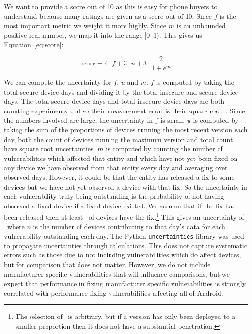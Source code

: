 We want to provide a score out of 10 as this is easy for phone buyers to understand because many ratings are given as a score out of 10.
Since $f$ is the most important metric we weight it more highly.
Since $m$ is an unbounded positive real number, we map it into the range [0--1).
This gives us Equation~\ref{eq:score}:

\begin{equation}
\mathrm{score} = 4 \cdot f + 3 \cdot u + 3 \cdot \frac{2}{1+e^m} \label{eq:score}
\end{equation}

We can compute the uncertainty for $f$, $u$ and $m$.
$f$ is computed by taking the total secure device days and dividing it by the total insecure and secure device days.
The total secure device days and total insecure device days are both counting experiments and so their measurement error is their square root~\cite{Taylor1997}.
Since the numbers involved are large, the uncertainty in $f$ is small.
$u$ is computed by taking the sum of the proportions of devices running the most recent version each day, both the count of devices running the maximum version and total count have square root uncertainties.
$m$ is computed by counting the number of vulnerabilities which affected that entity and which have not yet been fixed on any device we have observed from that entity every day and averaging over observed days.
However, it could be that the entity has released a fix to some devices but we have not yet observed a device with that fix.
So the uncertainty in each vulnerability truly being outstanding is the probability of not having observed a fixed device if a fixed device existed.
We assume that if the fix has been released then at least \daMeanOutstandingProbability\ of devices have the fix.\footnote{The selection of \daMeanOutstandingProbability\ is arbitrary, but if a version has only been deployed to a smaller proportion then it does not have a substantial penetration.}
This gives an uncertainty of \daMeanOutstandingUncertaintyEquation\ where $n$ is the number of devices contributing to that day's data for each vulnerability outstanding each day.
The Python \texttt{uncertainties} library was used to propagate uncertainties through calculations.
This does not capture systematic errors such as those due to not including vulnerabilities which do affect devices, but for comparison that does not matter.
However, we do not include manufacturer specific vulnerabilities that will influence comparisons, but we expect that performance in fixing manufacturer specific vulnerabilities is strongly correlated with performance fixing vulnerabilities affecting all of Android.

